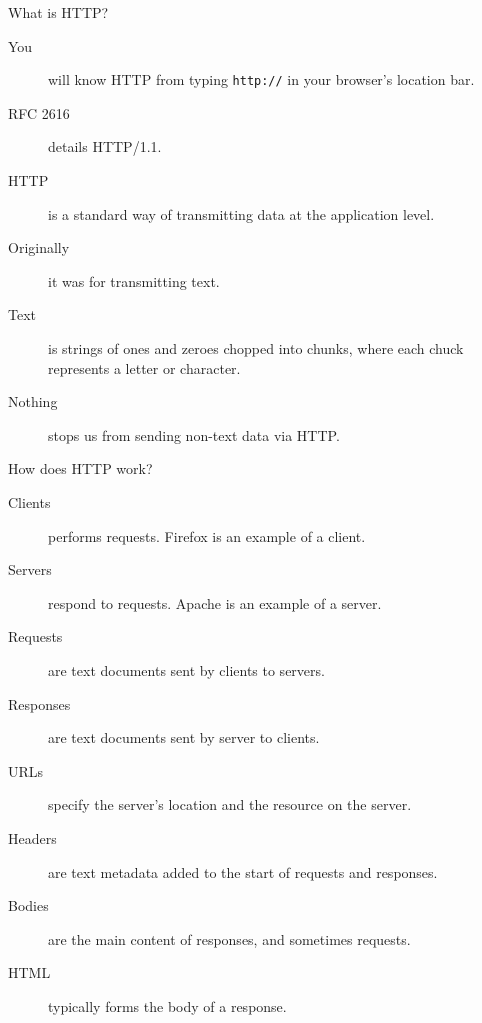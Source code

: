 \begin{frame}{What is HTTP?}
  \begin{description}
		\item[You] will know HTTP from typing \texttt{http://} in your browser's location bar.
    \item[RFC 2616] details HTTP/1.1.
    \item[HTTP] is a standard way of transmitting data at the application level.
    \item[Originally] it was for transmitting text.
    \item[Text] is strings of ones and zeroes chopped into chunks, where each chuck represents a letter or character.
    \item[Nothing] stops us from sending non-text data via HTTP. 
  \end{description}
\end{frame}


\begin{frame}{How does HTTP work?}
  \begin{description}
		\item[Clients] performs requests. Firefox is an example of a client.
    \item[Servers] respond to requests. Apache is an example of a server.
    \item[Requests] are text documents sent by clients to servers.
    \item[Responses] are text documents sent by server to clients.
    \item[URLs] specify the server's location and the resource on the server.
    \item[Headers] are text metadata added to the start of requests and responses.
    \item[Bodies] are the main content of responses, and sometimes requests.
    \item[HTML] typically forms the body of a response.  
  \end{description}
\end{frame}

